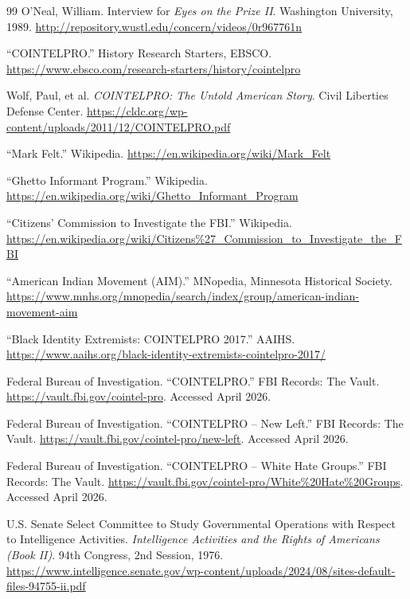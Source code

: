 \documentclass[12pt,openany]{book}
\begin{document}
\begin{thebibliography}{99}
O'Neal, William. Interview for \textit{Eyes on the Prize II}. Washington University, 1989. \url{http://repository.wustl.edu/concern/videos/0r967761n}

``COINTELPRO.'' History Research Starters, EBSCO. \url{https://www.ebsco.com/research-starters/history/cointelpro}

Wolf, Paul, et al. \textit{COINTELPRO: The Untold American Story}. Civil Liberties Defense Center. \url{https://cldc.org/wp-content/uploads/2011/12/COINTELPRO.pdf}

``Mark Felt.'' Wikipedia. \url{https://en.wikipedia.org/wiki/Mark_Felt}

``Ghetto Informant Program.'' Wikipedia. \url{https://en.wikipedia.org/wiki/Ghetto_Informant_Program}

``Citizens' Commission to Investigate the FBI.'' Wikipedia. \url{https://en.wikipedia.org/wiki/Citizens\%27_Commission_to_Investigate_the_FBI}

``American Indian Movement (AIM).'' MNopedia, Minnesota Historical Society. \url{https://www.mnhs.org/mnopedia/search/index/group/american-indian-movement-aim}

``Black Identity Extremists: COINTELPRO 2017.'' AAIHS. \url{https://www.aaihs.org/black-identity-extremists-cointelpro-2017/}

Federal Bureau of Investigation. ``COINTELPRO.'' FBI Records: The Vault. \url{https://vault.fbi.gov/cointel-pro}. Accessed April 2026.

Federal Bureau of Investigation. ``COINTELPRO -- New Left.'' FBI Records: The Vault. \url{https://vault.fbi.gov/cointel-pro/new-left}. Accessed April 2026.

Federal Bureau of Investigation. ``COINTELPRO -- White Hate Groups.'' FBI Records: The Vault. \url{https://vault.fbi.gov/cointel-pro/White%20Hate%20Groups}. Accessed April 2026.

U.S. Senate Select Committee to Study Governmental Operations with Respect to Intelligence Activities. \textit{Intelligence Activities and the Rights of Americans (Book II)}. 94th Congress, 2nd Session, 1976. \url{https://www.intelligence.senate.gov/wp-content/uploads/2024/08/sites-default-files-94755-ii.pdf}


\end{thebibliography}
\end{document}
